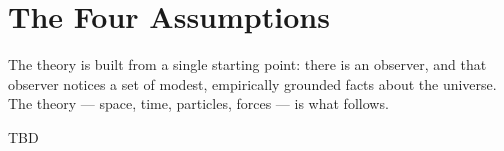 \chapter{The Four Assumptions}

The theory is built from a single starting point: there is an observer,
and that observer notices a set of modest, empirically grounded facts about
the universe. The theory --- space, time, particles, forces --- is
what follows.

TBD

